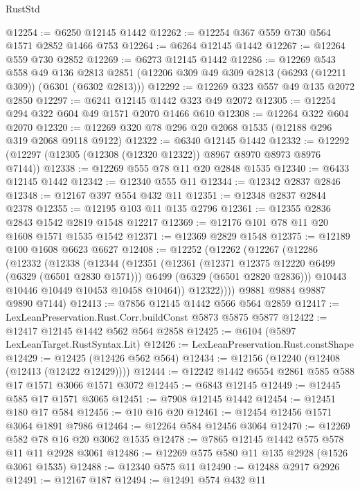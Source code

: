 \begin{lexlean}{RustStd}
\begin{coremodule}
{{@12254 := @6250 @12145 @1442
@12262 := @12254 @367 @559 @730 @564 @1571 @2852 @1466 @753
@12264 := @6264 @12145 @1442
@12267 := @12264 @559 @730 @2852
@12269 := @6273 @12145 @1442
@12286 := @12269
    @543
    @558
    @49
    @136
    @2813
    @2851
    (@12206 @309 @49 @309 @2813 (@6293 (@12211 @309)) (@6301 (@6302 @2813)))
@12292 := @12269 @323 @557 @49 @135 @2072 @2850
@12297 := @6241 @12145 @1442 @323 @49 @2072
@12305 := @12254 @294 @322 @604 @49 @1571 @2070 @1466 @610
@12308 := @12264 @322 @604 @2070
@12320 := @12269 @320 @78 @296 @20 @2068 @1535 (@12188 @296 @319 @2068 @9118 @9122)
@12322 := @6340 @12145 @1442
@12332 := @12292 (@12297 (@12305 (@12308 (@12320 @12322)) @8967 @8970 @8973 @8976 @7144))
@12338 := @12269 @555 @78 @11 @20 @2848 @1535
@12340 := @6433 @12145 @1442
@12342 := @12340 @555 @11
@12344 := @12342 @2837 @2846
@12348 := @12167 @397 @554 @432 @11
@12351 := @12348 @2837 @2844 @2378
@12355 := @12195 @103 @11 @135 @2796
@12361 := @12355 @2836 @2843 @1542 @2819 @1548 @12217
@12369 := @12176 @101 @78 @11 @20 @1608 @1571 @1535 @1542
@12371 := @12369 @2829 @1548
@12375 := @12189 @100 @1608 @6623 @6627
@12408 := @12252
    (@12262
      (@12267
        (@12286
          (@12332
            (@12338
              (@12344
                (@12351
                  (@12361
                    (@12371 @12375 @12220 @6499 (@6329 (@6501 @2830 @1571)))
                    @6499
                    (@6329 (@6501 @2820 @2836)))
                  @10443
                  @10446
                  @10449
                  @10453
                  @10458
                  @10464))
              @12322))))
      @9881
      @9884
      @9887
      @9890
      @7144)
@12413 := @7856 @12145 @1442 @566 @564 @2859
@12417 := LexLeanPreservation.Rust.Corr.buildConst @5873 @5875 @5877
@12422 := @12417 @12145 @1442 @562 @564 @2858
@12425 := @6104 (@5897 LexLeanTarget.RustSyntax.Lit)
@12426 := LexLeanPreservation.Rust.constShape
@12429 := @12425 (@12426 @562 @564)
@12434 := @12156 (@12240 (@12408 (@12413 (@12422 @12429))))
@12444 := @12242 @1442 @6554 @2861 @585 @588 @17 @1571 @3066 @1571 @3072
@12445 := @6843 @12145
@12449 := @12445 @585 @17 @1571 @3065
@12451 := @7908 @12145 @1442
@12454 := @12451 @180 @17 @584
@12456 := @10 @16 @20
@12461 := @12454 @12456 @1571 @3064 @1891 @7986
@12464 := @12264 @584 @12456 @3064
@12470 := @12269 @582 @78 @16 @20 @3062 @1535
@12478 := @7865 @12145 @1442 @575 @578 @11 @11 @2928 @3061
@12486 := @12269 @575 @580 @11 @135 @2928 (@1526 @3061 @1535)
@12488 := @12340 @575 @11
@12490 := @12488 @2917 @2926
@12491 := @12167 @187
@12494 := @12491 @574 @432 @11
}}
\end{coremodule}
\end{lexlean}
